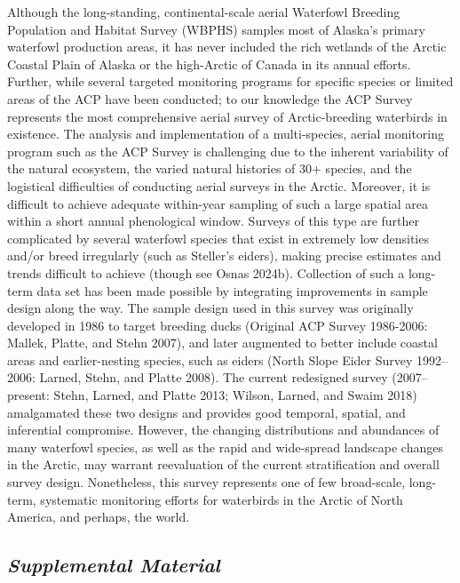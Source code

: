 \documentclass[
]{article}
\begin{document}
Although the long-standing, continental-scale aerial Waterfowl Breeding
Population and Habitat Survey (WBPHS) samples most of Alaska's primary
waterfowl production areas, it has never included the rich wetlands of
the Arctic Coastal Plain of Alaska or the high-Arctic of Canada in its
annual efforts. Further, while several targeted monitoring programs for
specific species or limited areas of the ACP have been conducted; to our
knowledge the ACP Survey represents the most comprehensive aerial survey
of Arctic-breeding waterbirds in existence. The analysis and
implementation of a multi-species, aerial monitoring program such as the
ACP Survey is challenging due to the inherent variability of the natural
ecosystem, the varied natural histories of 30+ species, and the
logistical difficulties of conducting aerial surveys in the Arctic.
Moreover, it is difficult to achieve adequate within-year sampling of
such a large spatial area within a short annual phenological window.
Surveys of this type are further complicated by several waterfowl
species that exist in extremely low densities and/or breed irregularly
(such as Steller's eiders), making precise estimates and trends
difficult to achieve (though see Osnas 2024b). Collection of such a
long-term data set has been made possible by integrating improvements in
sample design along the way. The sample design used in this survey was
originally developed in 1986 to target breeding ducks (Original ACP
Survey 1986-2006: Mallek, Platte, and Stehn 2007), and later augmented
to better include coastal areas and earlier-nesting species, such as
eiders (North Slope Eider Survey 1992--2006: Larned, Stehn, and Platte
2008). The current redesigned survey (2007--present: Stehn, Larned, and
Platte 2013; Wilson, Larned, and Swaim 2018) amalgamated these two
designs and provides good temporal, spatial, and inferential compromise.
However, the changing distributions and abundances of many waterfowl
species, as well as the rapid and wide-spread landscape changes in the
Arctic, may warrant reevaluation of the current stratification and
overall survey design. Nonetheless, this survey represents one of few
broad-scale, long-term, systematic monitoring efforts for waterbirds in
the Arctic of North America, and perhaps, the world.

\subsection*{\texorpdfstring{\emph{Supplemental
Material}}{Supplemental Material}}\label{supplemental-material}
\end{document}
